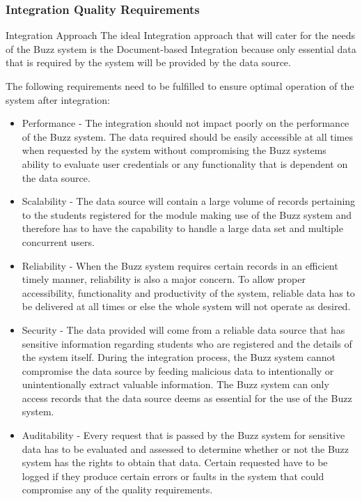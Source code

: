 \subsubsection{Integration Quality Requirements}


Integration Approach
The ideal Integration approach that will cater for the needs of the Buzz system is the Document-based Integration because only essential data that is required by the system will be provided by the data source.

The following requirements need to be fulfilled to ensure optimal operation of the system after integration:
\begin{itemize}

\item Performance - The integration should not impact poorly on the performance of the Buzz system. The data required should be easily accessible at all times when requested by the system without compromising the Buzz systems ability to evaluate user credentials or any functionality that is dependent on the data source.
\item Scalability - The data source will contain a large volume of records pertaining to the students registered for the module making use of the Buzz system and therefore has to have the capability to handle a large data set and multiple concurrent users.
\item Reliability - When the Buzz system requires certain records in an efficient timely manner, reliability is also a major concern. To allow proper accessibility, functionality and productivity of the system, reliable data has to be delivered at all times or else the whole system will not operate as desired.
\item Security - The data provided will come from a reliable data source that has sensitive information regarding students who are registered and the details of the system itself. During the integration process, the Buzz system cannot compromise the data source by feeding malicious data to intentionally or unintentionally extract valuable information. The Buzz system can only access records that the data source deems as essential for the use of the Buzz system.
\item Auditability - Every request that is passed by the Buzz system for sensitive data has to be evaluated and assessed to determine whether or not the Buzz system has the rights to obtain that data. Certain requested have to be logged if they produce certain errors or faults in the system that could compromise any of the quality requirements.
\end{itemize}